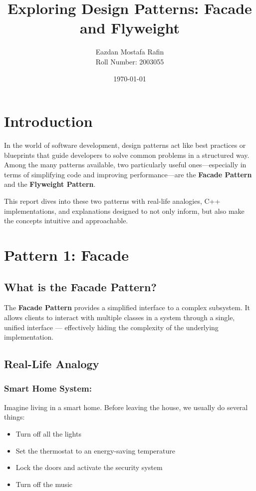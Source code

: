 \documentclass[12pt]{article}
\title{\textbf{Exploring Design Patterns: Facade and Flyweight}}
\author{Eazdan Mostafa Rafin \\
Roll Number: 2003055}
\date{\today}
\begin{document}
\maketitle

\section{Introduction}
In the world of software development, design patterns act like best practices or blueprints that guide developers to solve common problems in a structured way. Among the many patterns available, two particularly useful ones—especially in terms of simplifying code and improving performance—are the \textbf{Facade Pattern} and the \textbf{Flyweight Pattern}.

This report dives into these two patterns with real-life analogies, C++ implementations, and explanations designed to not only inform, but also make the concepts intuitive and approachable.

\section{Pattern 1: Facade}

\subsection{What is the Facade Pattern?}
The \textbf{Facade Pattern} provides a simplified interface to a complex subsystem. It allows clients to interact with multiple classes in a system through a single, unified interface — effectively hiding the complexity of the underlying implementation.

\subsection{Real-Life Analogy}
\subsubsection*{Smart Home System:}

Imagine living in a smart home. Before leaving the house, we usually do several things:
\begin{itemize}
    \item Turn off all the lights
    \item Set the thermostat to an energy-saving temperature
    \item Lock the doors and activate the security system
    \item Turn off the music
\end{itemize}
\end{document}
